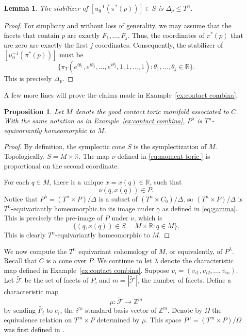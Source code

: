 \documentclass[12pt]{amsart}
\def\Z {{\mathbb{Z}}}
\def\R {{\mathbb{R}}}
\def\F {{\mathcal{F}}}
\newtheorem{lemma}[theorem]{Lemma}
\newtheorem{proposition}[theorem]{Proposition}
\theoremstyle{definition}
\numberwithin{equation}{section}
\begin{document}
\begin{lemma}\label{lemma:stabilizer}
 The stabilizer of $[u_{0}^{-1}(\pi^{*}(p))]\in S$ is
 $\Delta_{p}\leq T^n$.
 \end{lemma}

\begin{proof}
For simplicity and without loss of generality, we may assume that
the facets that contain $p$ are exactly $F_{1},...,F_{j}$. Thus, the
coordinates of $\pi^{*}(p)$ that are zero are exactly the first $j$
coordinates. Consequently, the stabilizer of
$[u_{0}^{-1}(\pi^{*}(p))]$ must be
$$
\{
\pi_{T}(e^{i\theta_{1}},e^{i\theta_{2}},...,e^{i\theta_{j}},1,1,...,1):
\theta_{1},...,\theta_{j}\in \R\}.$$ This is precisely $\Delta_{p}$.
\end{proof}

A few more lines will prove the claims made in
Example~\ref{ex:contact combina}.


\begin{proposition}\label{prop:contact combina}
Let $M$ denote the good contact toric manifold associated to $C$.
With the same notation as in Example~\ref{ex:contact combina},
$P^{\lambda}$ is $T^n$-equivariantly homeomorphic to $M$.
\end{proposition}
\begin{proof}
By definition, the symplectic cone $S$ is the symplectization of
$M$. Topologically, $S= M\times \R$. The map $\nu$ defined in
\eqref{eq:moment toric } is proportional on the second coordinate.


For each $q\in M$, there is a unique $x=x(q)\in \R$, such that
$$\nu(q,x(q))\in P .$$
Notice that $P^{\lambda}=(T^n\times P)/\Delta$ is a subset of
$(T^n\times C_{0})/\Delta$, so $(T^n\times P)/\Delta$ is
$T^n$-equivariantly homeomorphic to its image under $\gamma$ as
defined in \eqref{eq:gamma}. This is precisely the pre-image of $P$
under $\nu$, which is
$$\{(q,x(q))\in S=M\times \R : q\in M\}.$$ This is clearly $T^n$-equivariantly
homeomorphic to $M$.
\end{proof}


We now compute the $T^n$ equivariant cohomology of $M$, or
equivalently, of $P^{\lambda}$. Recall that $C$ is a cone over $P$.
We continue to let $\lambda$ denote the characteristic map defined
in Example~\ref{ex:contact combina}. Suppose
$v_{i}=(v_{i1},v_{i2},...,v_{in})$. Let $\tilde{\F}$ be the set of
facets of $P$, and $m=|\tilde{\F}|$, the number of facets. Define a
characteristic map
\begin{equation}\label{eq:mu}
 \mu
:\tilde{\F}\rightarrow \Z^m
\end{equation}
by sending $\tilde{F_{i}}$ to $e_{i}$, the $i^{th}$ standard basis
vector of $\Z^m$. Denote by $\Omega$ the equivalence relation on
$T^m\times P$ determined by $\mu$. This space $P^{\mu}=(T^m\times
P)/\Omega$ was first defined in \cite{DJ}.
\end{document}

